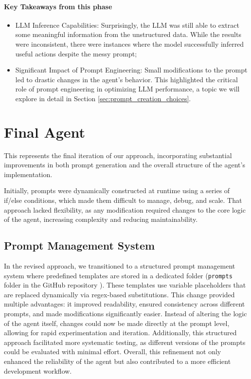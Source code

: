 \paragraph{Key Takeaways from this phase}
\begin{itemize}
  \item LLM Inference Capabilities: Surprisingly, the LLM was still able to extract
    some meaningful information from the unstructured data. While the results
    were inconsistent, there were instances where the model successfully inferred
    useful actions despite the messy prompt;

  \item Significant Impact of Prompt Engineering: Small modifications to the
    prompt led to drastic changes in the agent's behavior. This highlighted the critical
    role of prompt engineering in optimizing LLM performance, a topic we will
    explore in detail in Section \ref{sec:prompt_creation_choices}.
\end{itemize}

\section{Final Agent}
\label{sec:final_agent}

This represents the final iteration of our approach, incorporating substantial improvements
in both prompt generation and the overall structure of the agent's implementation.

Initially, prompts were dynamically constructed at runtime using a series of if/else
conditions, which made them difficult to manage, debug, and scale. That approach
lacked flexibility, as any modification required changes to the core logic of the
agent, increasing complexity and reducing maintainability.

\subsection{Prompt Management System}
In the revised approach, we transitioned to a structured prompt management system
where predefined templates are stored in a dedicated folder (\texttt{prompts} folder
in the GitHub repository \cite{projectrepo}). These templates use variable placeholders
that are replaced dynamically via regex-based substitutions. This change
provided multiple advantages: it improved readability, ensured consistency
across different prompts, and made modifications significantly easier. Instead
of altering the logic of the agent itself, changes could now be made directly at
the prompt level, allowing for rapid experimentation and iteration. Additionally,
this structured approach facilitated more systematic testing, as different versions
of the prompts could be evaluated with minimal effort. Overall, this refinement not
only enhanced the reliability of the agent but also contributed to a more efficient
development workflow.

